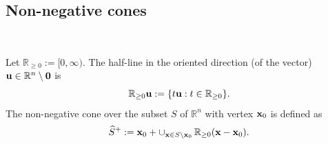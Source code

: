 \documentclass[11pt]{amsart}
\newcommand{\field}[1]{\mathbb{#1}}
\newcommand{\K}{\field{K}}
\newcommand{\R}{\field{R}}
\newcommand{\wh}[1]{\widehat{#1}}
\newcommand{\bbo}{{\bf 0}}
\newcommand{\bH}{{\bf H}}
\newcommand{\bS}{{\bf S}}
\newcommand{\bu}{{\bf u}}
\newcommand{\bx}{{\bf x}}
\newcommand{\Rgo}{{\R_{\geq 0}}}
\newcommand{\Rn}{{\R^n}}
\numberwithin{equation}{section}
\numberwithin{equation}{section}
\begin{document}

\subsection{Non-negative cones}

$  $

Let $\Rgo := [0,\infty)$. The half-line in the oriented direction (of the 
vector) $\bu\in\Rn\setminus \bbo$ is 
$$
\Rgo \bu := \{t\bu : t \in \Rgo\}.
$$
The non-negative cone over the subset $S$ of $\Rn$ with vertex $\bx_0$ is 
defined as 
$$
\wh{S}^+ := \bx_0 + \cup_{\bx\in S\setminus\bx_0}\,\Rgo(\bx-\bx_0).
$$ 
\end{document}
